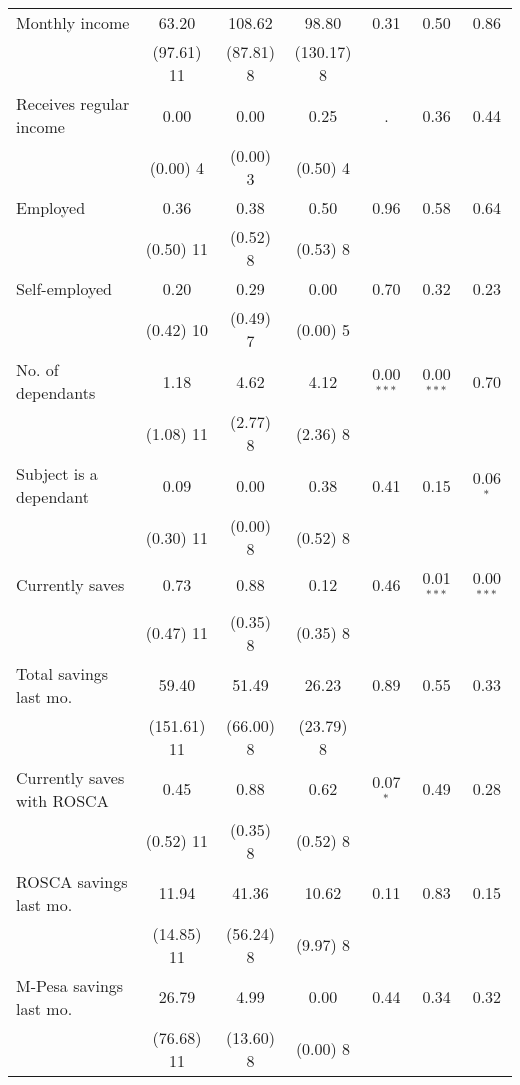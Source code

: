 \begin{table}[htbp]
{\begin{threeparttable}
\begin{tabular}{l*{6}{c}}
Monthly income&    63.20&   108.62&    98.80&     0.31&     0.50&     0.86\\
          &(97.61) 11&(87.81) 8&(130.17) 8&         &         &         \\
Receives regular income&     0.00&     0.00&     0.25&        .&     0.36&     0.44\\
          & (0.00) 4& (0.00) 3& (0.50) 4&         &         &         \\
Employed  &     0.36&     0.38&     0.50&     0.96&     0.58&     0.64\\
          &(0.50) 11& (0.52) 8& (0.53) 8&         &         &         \\
Self-employed&     0.20&     0.29&     0.00&     0.70&     0.32&     0.23\\
          &(0.42) 10& (0.49) 7& (0.00) 5&         &         &         \\
No. of dependants&     1.18&     4.62&     4.12&0.00$^{***}$&0.00$^{***}$&     0.70\\
          &(1.08) 11& (2.77) 8& (2.36) 8&         &         &         \\
Subject is a dependant&     0.09&     0.00&     0.38&     0.41&     0.15&0.06$^{*}$\\
          &(0.30) 11& (0.00) 8& (0.52) 8&         &         &         \\
Currently saves&     0.73&     0.88&     0.12&     0.46&0.01$^{***}$&0.00$^{***}$\\
          &(0.47) 11& (0.35) 8& (0.35) 8&         &         &         \\
Total savings last mo.&    59.40&    51.49&    26.23&     0.89&     0.55&     0.33\\
          &(151.61) 11&(66.00) 8&(23.79) 8&         &         &         \\
Currently saves with ROSCA&     0.45&     0.88&     0.62&0.07$^{*}$&     0.49&     0.28\\
          &(0.52) 11& (0.35) 8& (0.52) 8&         &         &         \\
ROSCA savings last mo.&    11.94&    41.36&    10.62&     0.11&     0.83&     0.15\\
          &(14.85) 11&(56.24) 8& (9.97) 8&         &         &         \\
M-Pesa savings last mo.&    26.79&     4.99&     0.00&     0.44&     0.34&     0.32\\
          &(76.68) 11&(13.60) 8& (0.00) 8&         &         &         \\

\end{tabular}
\end{threeparttable}}
\end{table}

